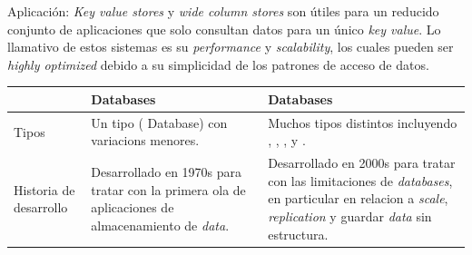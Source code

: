 Aplicación: \textit{Key value stores} y \textit{wide column stores} son útiles para un reducido conjunto de aplicaciones que solo consultan datos para un único \textit{key value}. Lo llamativo de estos sistemas es su \textit{performance} y \textit{scalability}, los cuales pueden ser \textit{highly optimized} debido a su simplicidad de los patrones de acceso de datos.



\begin{table}[h!]
    \tiny
   
\begin{tabular}{ |L{0.1\paperwidth}|L{0.3\paperwidth}|L{0.3\paperwidth}|}
\hline
	&
	 Databases &
	 Databases
 
\\ \hline
	Tipos&%
	Un tipo ( Database) con variacions menores.& %
	Muchos tipos distintos incluyendo , , , y . %
	
\\ \hline
	Historia de desarrollo&%
	Desarrollado en 1970s para tratar con la primera ola de aplicaciones de almacenamiento de \textit{data}.&%
	Desarrollado en 2000s para tratar con las limitaciones de  \textit{databases}, en particular en relacion a \textit{scale}, \textit{replication} y guardar \textit{data} sin estructura.%
	

\end{tabular}
\end{table}
